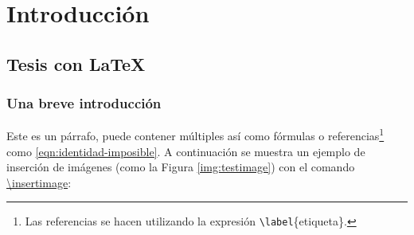 %
%

\chapter{Introducción}

\section{Tesis con \LaTeX}

\lipsum[4]

\subsection{Una breve introducción}
	
	Este es un párrafo, puede contener múltiples  así como fórmulas o referencias\footnote{Las referencias se hacen utilizando la expresión \texttt{\textbackslash label}\{etiqueta\}.} como \eqref{eqn:identidad-imposible}. A continuación se muestra un ejemplo de inserción de imágenes (como la Figura \ref{img:testimage}) con el comando \href{https://template-latex.github.io/informe.html#hlp-imagen}{\textbackslash insertimage}:

		
